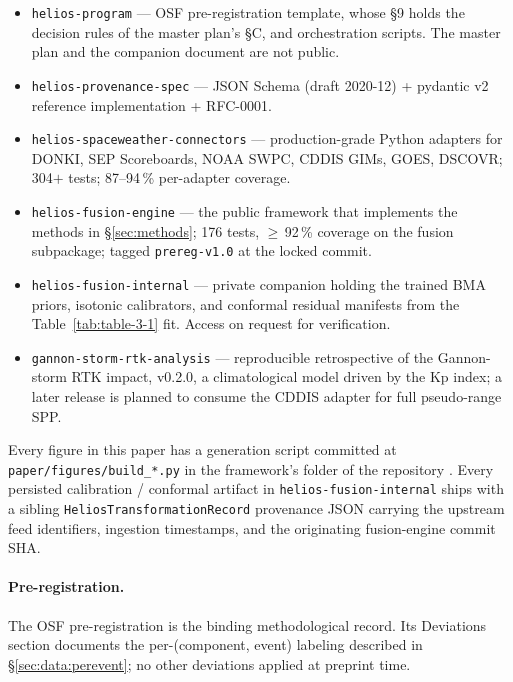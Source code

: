 \documentclass[11pt,letterpaper]{article}
\begin{document}
\begin{itemize}[leftmargin=*,itemsep=0pt]
  \item \texttt{helios-program} \cite{helios_program} ---
        OSF pre-registration template, whose §9 holds the decision rules of
        the master plan's §C, and orchestration scripts.  The master plan
        and the companion document \cite{helios_internal} are not public.
  \item \texttt{helios-provenance-spec} \cite{helios_provenance_spec} ---
        JSON Schema (draft 2020-12) + pydantic v2 reference implementation
        + RFC-0001.
  \item \texttt{helios-spaceweather-connectors} \cite{helios_connectors} ---
        production-grade Python adapters for DONKI, SEP Scoreboards, NOAA
        SWPC, CDDIS GIMs, GOES, DSCOVR; 304$+$ tests; 87--94\,\% per-adapter
        coverage.
  \item \texttt{helios-fusion-engine} \cite{helios_fusion_engine} ---
        the public framework that implements the methods in
        §\ref{sec:methods}; 176 tests, $\ge$\,92\,\% coverage on the
        fusion subpackage; tagged \texttt{prereg-v1.0} at the locked
        commit.
  \item \texttt{helios-fusion-internal} --- private companion holding the
        trained BMA priors, isotonic calibrators, and conformal residual
        manifests from the Table~\ref{tab:table-3-1} fit.  Access on
        request for verification.
  \item \texttt{gannon-storm-rtk-analysis} \cite{gannon_rtk} ---
        reproducible retrospective of the Gannon-storm RTK impact,
        v0.2.0, a climatological model driven by the Kp index;
        a later release is planned to consume the CDDIS adapter for
        full pseudo-range SPP.
\end{itemize}

Every figure in this paper has a generation script committed at
\texttt{paper/figures/build\_*.py} in the
framework's folder of the repository \cite{helios_fusion_engine}.  Every persisted calibration / conformal artifact in
\texttt{helios-fusion-internal} ships with a sibling
\texttt{HeliosTransformationRecord} provenance JSON
\cite{helios_provenance_spec} carrying the upstream feed identifiers,
ingestion timestamps, and the originating fusion-engine commit SHA.

\paragraph{Pre-registration.}
The OSF pre-registration \cite{osf_prereg} is the binding methodological
record.  Its Deviations section documents the per-(component, event)
labeling described in §\ref{sec:data:perevent}; no other deviations
applied at preprint time.
\end{document}
